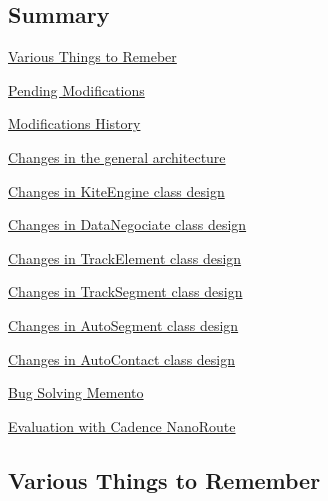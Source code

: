 \hypertarget{pageNotes_Summary}{}\subsection{Summary}\label{pageNotes_Summary}

\begin{DoxyItemize}
\item \hyperlink{pageNotes_ssecVariousNotes}{Various Things to Remeber}
\item \hyperlink{pageNotes_secPendingModifications}{Pending Modifications}
\item \hyperlink{pageNotes_secModificationsHistory}{Modifications History}
\item \hyperlink{pageNotes_ssecArchitectureChanges}{Changes in the general architecture}
\begin{DoxyItemize}
\item \hyperlink{pageNotes_ssecModificationsKiteEngine}{Changes in Kite\+Engine class design}
\item \hyperlink{pageNotes_ssecModificationsDataNegociate}{Changes in Data\+Negociate class design}
\item \hyperlink{pageNotes_ssecModificationsTrackElement}{Changes in Track\+Element class design}
\item \hyperlink{pageNotes_ssecModificationsTrackSegment}{Changes in Track\+Segment class design}
\item \hyperlink{pageNotes_ssecModificationsAutoSegment}{Changes in Auto\+Segment class design}
\item \hyperlink{pageNotes_ssecModificationsAutoContact}{Changes in Auto\+Contact class design}
\end{DoxyItemize}
\item \hyperlink{pageNotes_ssecBugBusting}{Bug Solving Memento}
\item \hyperlink{pageNotes_ssecNanoRoute}{Evaluation with Cadence Nano\+Route}
\end{DoxyItemize}\hypertarget{pageNotes_ssecVariousNotes}{}\subsection{Various Things to Remember}\label{pageNotes_ssecVariousNotes}

